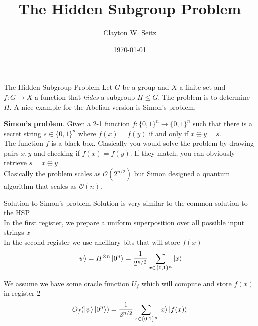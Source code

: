 \documentclass[aspectratio=1610]{beamer}					%
\title{The Hidden Subgroup Problem}	%
\author{Clayton W. Seitz}								%
\date{\today}									%
\begin{document}
\begin{frame}
  \titlepage
\end{frame}



\begin{frame}{The Hidden Subgroup Problem}
Let $G$ be a group and $X$ a finite set and $f:G\rightarrow X$ a function that \emph{hides} a subgroup $H\leq G$. The problem is to determine $H$. A nice example for the Abelian version is Simon's problem.\\
\vspace{0.2in}

\textbf{Simon's problem}. Given a 2-1 function $f:\{0,1\}^{n}\rightarrow \{0,1\}^{n}$ such that there is a secret string $s\in\{0,1\}^{n}$ where $f(x) = f(y)$ if and only if $x\oplus y = s$.\\
\vspace{0.2in}
The function $f$ is a black box. Clasically you would solve the problem by drawing pairs $x,y$ and checking if $f(x) = f(y)$. If they match, you can obviously retrieve $s = x\oplus y$\\
\vspace{0.2in}
Clasically the problem scales as $\mathcal{O}(2^{n/2})$ but Simon designed a quantum algorithm that scales as $\mathcal{O}(n)$.

\end{frame}

\begin{frame}{Solution to Simon's problem}
Solution is very similar to the common solution to the HSP\\
\vspace{0.1in}
In the first register, we prepare a uniform superposition over all possible input strings $x$\\
\vspace{0.1in}
In the second register we use ancillary bits that will store $f(x)$\\
\begin{equation*}
\ket{\psi} = H^{\otimes n}\ket{0^{n}} = \frac{1}{2^{n/2}}\sum_{x\in\{0,1\}^{n}}\ket{x}
\end{equation*}

We assume we have some oracle function $U_{f}$ which will compute and store $f(x)$ in register 2
\begin{equation*}
O_{f}(\ket{\psi}\ket{0^{n}}) = \frac{1}{2^{n/2}}\sum_{x\in\{0,1\}^{n}}\ket{x}\ket{f(x)}
\end{equation*}



\end{frame}
\end{document}
